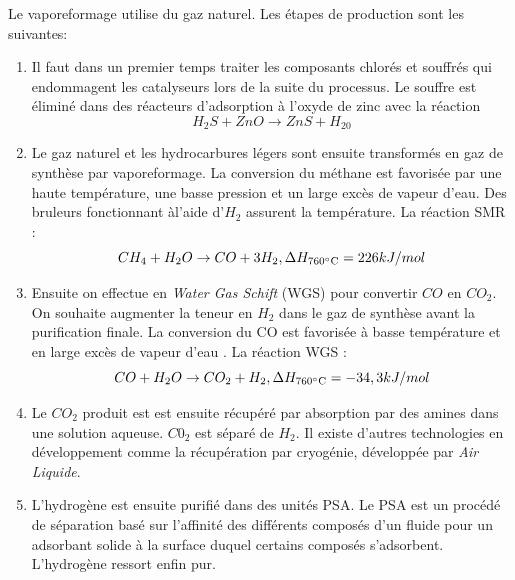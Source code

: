 \documentclass[11pt,french,a4paper]{article}
\begin{document}
Le vaporeformage utilise du gaz naturel. Les étapes de production sont les suivantes:
\begin{enumerate}
\item Il faut dans un premier temps traiter les composants chlorés et souffrés qui endommagent les catalyseurs lors de la suite du processus. Le souffre est éliminé dans des réacteurs d’adsorption à l’oxyde de zinc \cite{Prod_gaz_synth}
 avec la réaction $$ H_2S + ZnO \rightarrow ZnS + H_20 $$ 

\item Le gaz naturel et les hydrocarbures légers sont ensuite transformés en gaz de synthèse par vaporeformage. La conversion du méthane est favorisée par une haute température, une basse pression et un large excès de vapeur d’eau. Des bruleurs fonctionnant àl'aide d'$H_2$ assurent la température. La réaction SMR : $$ CH_4 + H_2O \rightarrow CO + 3H_2 , \Delta H_{760\celsius}=226kJ/mol$$

\item Ensuite on effectue en \emph{Water Gas Schift} (WGS) pour convertir $CO$ en $CO_2$. On souhaite augmenter la teneur en $H_2$ dans le gaz de synthèse avant la purification finale. La conversion du CO est favorisée à basse température et en large excès de vapeur d’eau \cite{Prod_gaz_synth}. La réaction WGS : $$ CO + H_2O \rightarrow CO_2 + H_2 , \Delta H_{760\celsius} =-34,3kJ/mol$$

\item Le $CO_2$ produit est est ensuite récupéré par absorption par des amines dans une solution aqueuse. $C0_2$ est séparé de $H_2$. Il existe d'autres technologies en développement comme la récupération par cryogénie, développée par \emph{Air Liquide}.

\item L'hydrogène est ensuite purifié dans des unités PSA. Le PSA est un procédé de séparation basé sur l’affinité des différents composés d’un fluide pour un adsorbant solide à la surface duquel certains composés s’adsorbent. L'hydrogène ressort enfin pur. \\

\end{enumerate}
\end{document}
